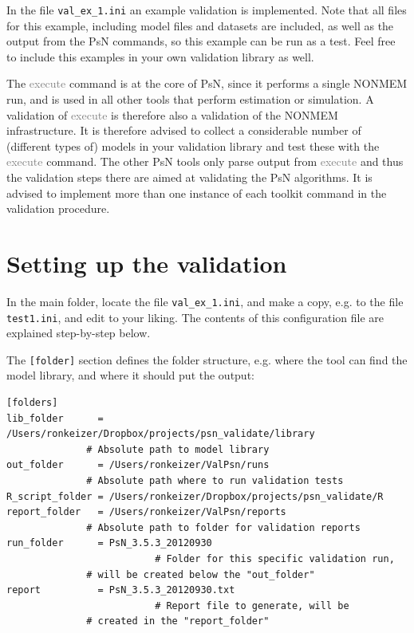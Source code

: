 \documentclass[a4,11pt]{report} \usepackage[pdftex]{graphicx}
\newcommand{\psn}[1]{\textcolor{Grey}{#1}}
\begin{document}
In the file {\tt val\_ex\_1.ini} an example validation is implemented. Note
that all files for this example, including model files and datasets
are included, as well as the output from the PsN commands, so this
example can be run as a test. Feel free to include this examples in
your own validation library as well.

\vspace{5pt}

\noindent The \psn{execute} command is at the core of PsN, since it
performs a single NONMEM run, and is used in all other tools that
perform estimation or simulation. A validation of \psn{execute} is
therefore also a validation of the NONMEM infrastructure. It is
therefore advised to collect a considerable number of (different types
of) models in your validation library and test these with the
\psn{execute} command. The other PsN tools only parse output from
\psn{execute} and thus the validation steps there are aimed at
validating the PsN algorithms. It is advised to implement more than one
instance of each toolkit command in the validation procedure.

\section{Setting up the validation}
\vspace{10pt} In the main folder, locate the file {\tt val\_ex\_1.ini},
and make a copy, e.g. to the file {\tt test1.ini}, and edit
to your liking. The contents of this configuration file are explained
step-by-step below.

\vspace{5pt}

\noindent The {\tt [folder]} section defines the folder structure,
e.g. where the tool can find the model library, and where it should
put the output:

\begin{lstlisting}
[folders]
lib_folder      = /Users/ronkeizer/Dropbox/projects/psn_validate/library
			  # Absolute path to model library
out_folder      = /Users/ronkeizer/ValPsn/runs
			  # Absolute path where to run validation tests
R_script_folder = /Users/ronkeizer/Dropbox/projects/psn_validate/R
report_folder   = /Users/ronkeizer/ValPsn/reports
			  # Absolute path to folder for validation reports
run_folder      = PsN_3.5.3_20120930
                          # Folder for this specific validation run,
			  # will be created below the "out_folder"
report          = PsN_3.5.3_20120930.txt
                          # Report file to generate, will be
			  # created in the "report_folder"
\end{lstlisting}
\end{document}
